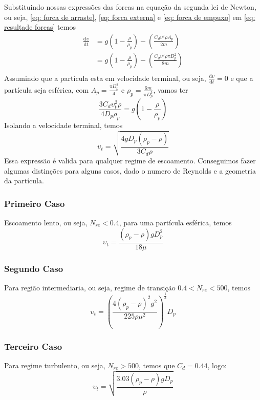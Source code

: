 Substituindo nossas expressões das forcas na equação da segunda lei de Newton, ou seja, \eqref{eq:
forca de arraste}, \eqref{eq: forca externa} e \eqref{eq: forca de empuxo} em \eqref{eq: resultade
forcas} temos
\begin{align}
    \frac{\mathrm{d}\upsilon }{\mathrm{d}t} &= g \left( 1 - \frac{\rho}{\rho _{p} }  \right) - \left( \frac{C_{d} \upsilon ^{2} \rho A_{p} }{2m} \right)\\
    &= g \left( 1 - \frac{\rho}{\rho _{p} }  \right) - \left( \frac{C_{d} \upsilon ^{2} \rho \pi D_{p}^{2} }{8m} \right)\\ 
\end{align}
Assumindo que a partícula esta em velocidade terminal, ou seja, \(\frac{\mathrm{d}\upsilon
}{\mathrm{d}t} = 0\) e que a partícula seja esférica, com \(A_{p} = \frac{\pi D_{p} ^{2} }{4}\) e
\(\rho _{p} = \frac{6m}{\pi D_{p} ^{3} }\), vamos ter
\begin{equation}
    \frac{3C_{d} \upsilon _{t} ^{2} \rho }{4D_{p}\rho _{p}  }  = g \left( 1 - \frac{\rho}{\rho _{p} }  \right)
\end{equation}  
Isolando a velocidade terminal, temos
\begin{equation}
    \upsilon _{t} = \sqrt{\frac{4gD_{p}\left( \rho _{p} - \rho \right) }{3C_{d} \rho }  }
\end{equation}
Essa expressão é valida para qualquer regime de escoamento. Conseguimos fazer algumas distinções
para alguns casos, dado o numero de Reynolds e a geometria da partícula. \par
\subsubsection{Primeiro Caso}
Escoamento lento, ou seja, \(N_{re} < 0.4\), para uma partícula esférica, temos
\begin{equation}
    \upsilon _{t} = \frac{\left( \rho _{p} -\rho  \right) g D_{p} ^{2} }{18\mu }
\end{equation}
\subsubsection{Segundo Caso}
Para região intermediaria, ou seja, regime de transição \(0.4 < N_{re} < 500\), temos
\begin{equation}
    \upsilon _{t} = \left(\frac{4\left( \rho _{p} -\rho  \right)^{2} g^{2}}{225 \rho \mu ^{2} } \right)^{\frac{1}{3}}D_{p} 
\end{equation}
\subsubsection{Terceiro Caso}
Para regime turbulento, ou seja, \(N_{re} > 500\), temos que \(C_{d} =0.44\), logo:
\begin{equation}
    \upsilon _{t} = \sqrt{\frac{3.03\left( \rho _{p} -\rho  \right) gD_{p}}{\rho }  }
\end{equation}
